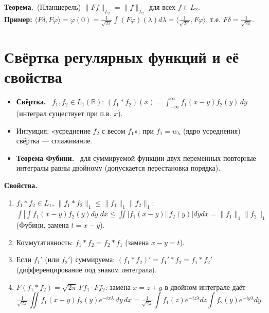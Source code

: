 \documentclass[11pt,a4paper]{article}
\newcommand{\RR}{\mathbb R}
\newcommand{\df}[1]{\textbf{#1.}~}
\newcommand{\thm}{\textbf{Теорема.}~}
\begin{document}
\thm (Планшерель) $\|Ff\|_{L_2}=\|f\|_{L_2}$ для всех $f\in L_2$.\\
\textbf{Пример:} $\langle F\delta,F\varphi\rangle=\varphi(0)=\frac1{\sqrt{2\pi}}\int(F\varphi)(\lambda)d\lambda=\langle\frac1{\sqrt{2\pi}},F\varphi\rangle$, т.е. $F\delta=\frac1{\sqrt{2\pi}}$.

\section{Свёртка регулярных функций и её свойства}
\begin{defs}
\begin{itemize}
\item \df{Свёртка} $f_1,f_2\in L_1(\RR)$: $(f_1*f_2)(x)=\int_{-\infty}^\infty f_1(x-y)f_2(y)\,dy$ (интеграл существует при п.в. $x$).
\item Интуиция: «усреднение $f_2$ с весом $f_1$»; при $f_1=w_h$ (ядро усреднения) свёртка — сглаживание.
\item \df{Теорема Фубини} для суммируемой функции двух переменных повторные интегралы равны двойному (допускается перестановка порядка).
\end{itemize}
\end{defs}
\textbf{Свойства.}
\begin{enumerate}[label=(\roman*)]
\item $f_1*f_2\in L_1$, $\|f_1*f_2\|_1\le\|f_1\|_1\|f_2\|_1$: $\int|\int f_1(x-y)f_2(y)dy|dx\le\iint|f_1(x-y)||f_2(y)|dydx=\|f_1\|_1\|f_2\|_1$ (Фубини, замена $t=x-y$).
\item Коммутативность: $f_1*f_2=f_2*f_1$ (замена $x-y=t$).
\item Если $f_1'$ (или $f_2'$) суммируема: $(f_1*f_2)'=f_1'*f_2=f_1*f_2'$ (дифференцирование под знаком интеграла).
\item $F(f_1*f_2)=\sqrt{2\pi}\,Ff_1\cdot Ff_2$: замена $x=z+y$ в двойном интеграле даёт
\[\tfrac1{\sqrt{2\pi}}\iint f_1(x-y)f_2(y)e^{-ix\lambda}\,dy\,dx=\tfrac1{\sqrt{2\pi}}\int f_1(z)e^{-iz\lambda}dz\int f_2(y)e^{-iy\lambda}dy.\]
\end{enumerate}
\end{document}
